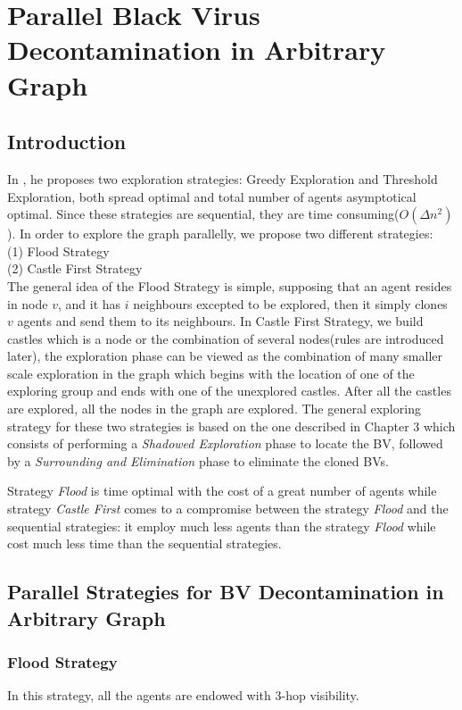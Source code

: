 \chapter {Parallel Black Virus Decontamination in Arbitrary Graph}
\label{TL}

\section{Introduction}
In \cite{Cai}, he proposes two exploration strategies: Greedy Exploration and Threshold Exploration, both spread optimal and total number of agents asymptotical optimal. Since these strategies are sequential, they are time consuming($O(\Delta n^2)$).  In order to explore the graph parallelly, we propose two different strategies: \\
(1) Flood Strategy\\
(2) Castle First Strategy\\
The general idea of the Flood Strategy is simple, supposing that an agent resides in node $v$, and it has $i$ neighbours excepted to be explored, then it simply clones $v$ agents and send them to its neighbours. In Castle First Strategy, we build castles which is a node or the combination of several nodes(rules are introduced later), the exploration phase can be viewed as the combination of many smaller scale exploration in the graph which begins with the location of one of the exploring group and ends with one of the unexplored castles. After all the castles are explored, all the nodes in the graph are explored. The general exploring strategy for these two strategies is based on the one described in Chapter 3 which consists of performing a {\em Shadowed Exploration} phase to locate the BV, followed by a {\em Surrounding and Elimination} phase to eliminate the cloned BVs. 

Strategy {\em Flood}  is time optimal with the cost of a great number of agents while strategy {\em Castle First} comes to a compromise between the strategy {\em Flood} and the sequential strategies: it employ much less agents than the strategy {\em Flood} while cost much less time than the sequential strategies. 

\section{Parallel Strategies for BV Decontamination in Arbitrary Graph}
\subsection{Flood Strategy}
In this strategy, all the agents are endowed with 3-hop visibility.

